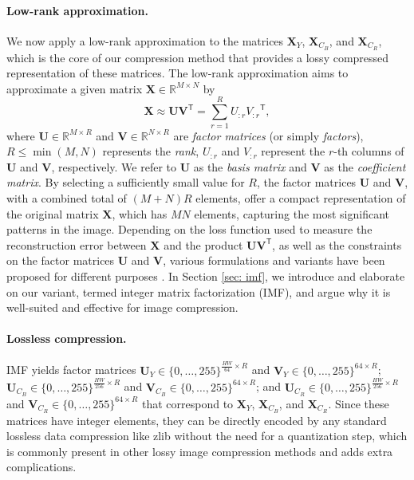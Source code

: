 \paragraph{Low-rank approximation.} 
We now apply a low-rank approximation to the matrices $\bm{X}_{Y}$, $\bm{X}_{C_B}$, and $\bm{X}_{C_R}$, which is the core of our compression method that provides a lossy compressed representation of these matrices.  The low-rank approximation \citep{eckart1936approximation} aims to approximate a given matrix $ \bm{X} \in \mathbb{R}^{M \times N} $ by 
\begin{equation} \label{eq: lra}
	\bm{X} \approx \bm{U} \bm{V}^\mathsf{T} = \sum_{r=1}^{R} U_{:r} {V_{:r}}^\mathsf{T},
\end{equation} 
where $\bm{U} \in \mathbb{R}^{M \times R}$ and $\bm{V} \in \mathbb{R}^{N \times R}$ are \emph{factor matrices} (or simply \emph{factors}), $R \leq \min(M,N)$ represents the \emph{rank}, $U_{:r}$ and $V_{:r}$ represent the $r$-th columns of $\bm{U}$ and $\bm{V}$, respectively. We refer to $\bm{U}$ as the \emph{basis matrix} and $\bm{V}$ as the \emph{coefficient matrix}. By selecting a sufficiently small value for $R$, the factor matrices $\bm{U}$ and $\bm{V}$, with a combined total of $(M+N)R$ elements, offer a compact representation of the original matrix $\bm{X}$, which has $MN$ elements, capturing the most significant patterns in the image. Depending on the loss function used to measure the reconstruction error between $\bm{X}$ and the product $\bm{U} \bm{V}^\mathsf{T}$, as well as the constraints on the factor matrices $\bm{U}$ and $\bm{V}$, various formulations and variants have been proposed for different purposes \cite{lee2000algorithms, ding2008convex, lin2005integer}. In Section \ref{sec: imf}, we introduce and elaborate on our variant, termed integer matrix factorization (IMF), and argue why it is well-suited and effective for image compression. 


\paragraph{Lossless compression.}
IMF yields factor matrices $\bm{U}_{Y} \in \{0, \ldots, 255\}^{\frac{HW}{64} \times R}$ and $\bm{V}_{Y} \in \{0, \ldots, 255\}^{64 \times R}$; $\bm{U}_{C_B} \in \{0, \ldots, 255\}^{\frac{HW}{256} \times R}$ and $\bm{V}_{C_B} \in \{0, \ldots, 255\}^{64 \times R}$; and $\bm{U}_{C_R} \in \{0, \ldots, 255\}^{\frac{HW}{256} \times R}$ and $\bm{V}_{C_R} \in \{0, \ldots, 255\}^{64 \times R}$ that correspond to $\bm{X}_{Y}$, $\bm{X}_{C_B}$, and $\bm{X}_{C_R}$. Since these matrices have integer elements, they can be directly encoded by any standard lossless data compression like zlib \cite{deutsch1996zlib} without the need for a quantization step, which is commonly present in other lossy image compression methods and adds extra complications.

